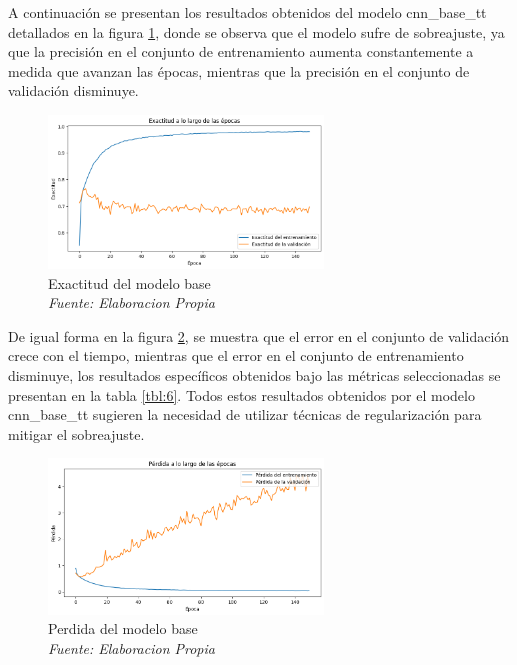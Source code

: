 A continuación se presentan los resultados obtenidos del modelo cnn\_base\_tt detallados en la figura \ref{fig:exactitud}, donde se observa que el modelo sufre de sobreajuste, ya que la precisión en el conjunto de entrenamiento aumenta constantemente a medida que avanzan las épocas, mientras que la precisión en el conjunto de validación disminuye.

\begin{figure}[h!]
	\includegraphics[width=0.65\textwidth]{capitulo5/figuras/exactitud.png}
	\caption{Exactitud del modelo base
		\\\textit{Fuente: Elaboracion Propia}}
	\label{fig:exactitud}
\end{figure}

 De igual forma en la figura \ref{fig:perdida}, se muestra que el error en el conjunto de validación crece con el tiempo, mientras que el error en el conjunto de entrenamiento disminuye, los resultados específicos obtenidos bajo las métricas seleccionadas se presentan en la tabla \ref{tbl:6}. Todos estos resultados obtenidos por el modelo cnn\_base\_tt  sugieren la necesidad de utilizar técnicas de regularización para mitigar el sobreajuste.



\begin{figure}[h!]
	\includegraphics[width=0.65\textwidth]{capitulo5/figuras/perdida.png}
	\caption{Perdida del modelo base
		\\\textit{Fuente: Elaboracion Propia}}
	\label{fig:perdida}
\end{figure}

